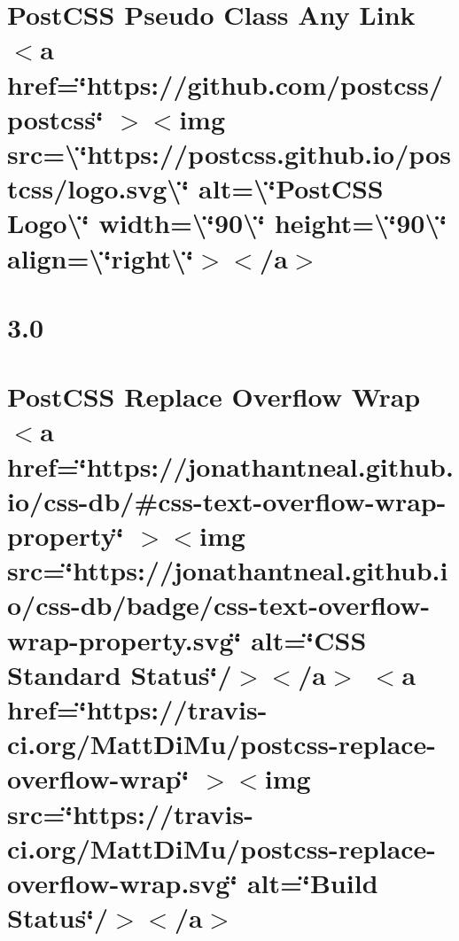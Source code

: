 \documentclass[twoside]{book}
\newcommand{\+}{\discretionary{\mbox{\scriptsize$\hookleftarrow$}}{}{}}
\begin{document}
\chapter{Post\+CSS Pseudo Class Any Link \texorpdfstring{$<$}{<}a href=\char`\"{}https\+://github.\+com/postcss/postcss\char`\"{} \texorpdfstring{$>$}{>}\texorpdfstring{$<$}{<}img src=\textbackslash{}\char`\"{}https\+://postcss.\+github.\+io/postcss/logo.\+svg\textbackslash{}\char`\"{} alt=\textbackslash{}\char`\"{}\+Post\+CSS Logo\textbackslash{}\char`\"{} width=\textbackslash{}\char`\"{}90\textbackslash{}\char`\"{} height=\textbackslash{}\char`\"{}90\textbackslash{}\char`\"{} align=\textbackslash{}\char`\"{}right\textbackslash{}\char`\"{}\texorpdfstring{$>$}{>}\texorpdfstring{$<$}{<}/a\texorpdfstring{$>$}{>}}
\label{md__c___users_vaishnavi_jadhav__desktop__developer_code_mean_stack_example_client_node_modules_p86e80c294317ecea0f1f2b53b4815e8a}

\chapter{3.0}
\label{md__c___users_vaishnavi_jadhav__desktop__developer_code_mean_stack_example_client_node_modules_pdba646f97aa5716b8fbcd257c9b2f94f}

\chapter{Post\+CSS Replace Overflow Wrap \texorpdfstring{$<$}{<}a href=\char`\"{}https\+://jonathantneal.\+github.\+io/css-\/db/\#css-\/text-\/overflow-\/wrap-\/property\char`\"{} \texorpdfstring{$>$}{>}\texorpdfstring{$<$}{<}img src=\char`\"{}https\+://jonathantneal.\+github.\+io/css-\/db/badge/css-\/text-\/overflow-\/wrap-\/property.\+svg\char`\"{} alt=\char`\"{}\+CSS Standard Status\char`\"{}/\texorpdfstring{$>$}{>}\texorpdfstring{$<$}{<}/a\texorpdfstring{$>$}{>} \texorpdfstring{$<$}{<}a href=\char`\"{}https\+://travis-\/ci.\+org/\+Matt\+Di\+Mu/postcss-\/replace-\/overflow-\/wrap\char`\"{} \texorpdfstring{$>$}{>}\texorpdfstring{$<$}{<}img src=\char`\"{}https\+://travis-\/ci.\+org/\+Matt\+Di\+Mu/postcss-\/replace-\/overflow-\/wrap.\+svg\char`\"{} alt=\char`\"{}\+Build Status\char`\"{}/\texorpdfstring{$>$}{>}\texorpdfstring{$<$}{<}/a\texorpdfstring{$>$}{>}}
\label{md__c___users_vaishnavi_jadhav__desktop__developer_code_mean_stack_example_client_node_modules_p4e967047bee79a31d6137e559288df38}

\end{document}
